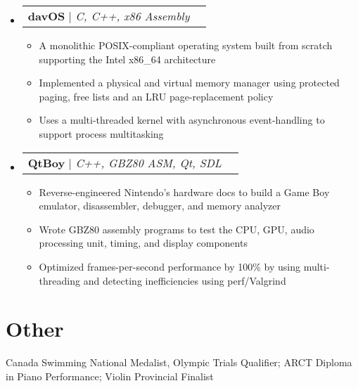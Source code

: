 \documentclass[letterpaper,10pt]{article}
\makeatletter
\newcommand{\resumeItem}[1]{
  \item\small{
    {#1 \vspace{-2pt}}
  }
}
\newcommand{\resumeProjectHeading}[2]{
    \item
    \begin{tabular*}{0.97\textwidth}{l@{\extracolsep{\fill}}r}
      \small#1 & #2 \\
    \end{tabular*}\vspace{-7pt}
}
\newcommand{\resumeSubHeadingListStart}{\begin{itemize}[leftmargin=0.15in, label={}]}
\newcommand{\resumeSubHeadingListEnd}{\end{itemize}}
\newcommand{\resumeItemListStart}{\begin{itemize}}
\newcommand{\resumeItemListEnd}{\end{itemize}\vspace{-5pt}}
\makeatother
\begin{document}
    \resumeSubHeadingListStart
      \resumeProjectHeading
          {\textbf{davOS}
            \href{https://github.com/davidtranhq/davOS}{\faicon{github}}
            $|$ \emph{C, C++, x86 Assembly}
          }{}
          \resumeItemListStart
            \resumeItem{ A monolithic POSIX-compliant operating system built from scratch supporting the Intel x86\_64 architecture}
            \resumeItem{ Implemented a physical and virtual memory manager using protected paging, free lists and an LRU page-replacement policy }
            \resumeItem{ Uses a multi-threaded kernel with asynchronous event-handling to support process multitasking}
          \resumeItemListEnd
      \resumeProjectHeading
          {\textbf{QtBoy}
            \href{https://github.com/davidtranhq/qtboy}{\faicon{github}}
            $|$ \emph{C++, GBZ80 ASM, Qt, SDL } 
          }{}
          \resumeItemListStart
            \resumeItem{ Reverse-engineered Nintendo's hardware docs to build a Game Boy emulator, disassembler, debugger, and memory analyzer}
            \resumeItem{ Wrote GBZ80 assembly programs to test the CPU, GPU, audio processing unit, timing, and display components}
            \resumeItem{ Optimized frames-per-second performance by 100\% by using multi-threading and detecting inefficiencies using perf/Valgrind }
          \resumeItemListEnd
        

    \resumeSubHeadingListEnd


\section{Other}
\begin{itemize}[leftmargin=0.15in, label={}]
   \small{\item{
    {Canada Swimming National Medalist, Olympic Trials Qualifier; ARCT Diploma in Piano Performance}; Violin Provincial Finalist}}
\end{itemize}
\end{document}
